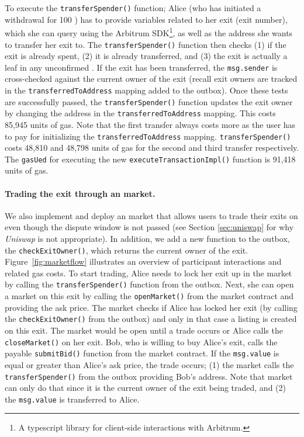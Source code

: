 To execute the \texttt{transferSpender()} function; Alice (who has initiated a withdrawal for 100 \ethtwo) has to provide variables related to her exit (\eg exit number), which she can query using the Arbitrum SDK\footnote{A typescript library for client-side interactions with Arbitrum.}, as well as the \layerone address she wants to transfer her exit to. The \texttt{transferSpender()} function then checks (1) if the exit is already spent, (2) it is already transferred, and (3) the exit is actually a leaf in any unconfirmed \rblock. If the exit has been transferred, the \texttt{msg.sender} is cross-checked against the current owner of the exit (recall exit owners are tracked in the \texttt{transferredToAddress} mapping added to the outbox). Once these tests are successfully passed, the \texttt{transferSpender()} function updates the exit owner by changing the address in the \texttt{transferredToAddress} mapping. This costs  85,945 units of \layerone gas. Note that the first transfer always costs more as the user has to pay for initializing the \texttt{transferredToAddress} mapping. \texttt{transferSpender()} costs 48,810 and 48,798 units of \layerone gas for the second and third transfer respectively. The \texttt{gasUed} for executing the new \texttt{executeTransactionImpl()} function is 91,418 units of \layerone gas.


\paragraph*{Trading the exit through an \layerone market.} We also implement and deploy an \layerone market that allows users to trade their exits on \layerone even though the dispute window is not passed (see Section \ref{sec:uniswap} for why \textit{Uniswap} is not appropriate). In addition, we add a new function to the \arb \nitro outbox, the \texttt{checkExitOwner()}, which returns the current owner of the exit. Figure~\ref{fig:marketflow} illustrates an overview of participant interactions and related gas costs. To start trading, Alice needs to lock her exit up in the market by calling the \texttt{transferSpender()} function from the outbox. Next, she can open a market on this exit by calling the \texttt{openMarket()} from the market contract and providing the ask price. The market checks if Alice has locked her exit (by calling the \texttt{checkExitOwner()} from the outbox) and only in that case a listing is created on this exit. The market would be open until a trade occurs or Alice calls the \texttt{closeMarket()} on her exit. Bob, who is willing to buy Alice's exit, calls the payable \texttt{submitBid()} function from the market contract. If the \texttt{msg.value} is equal or greater than Alice's ask price, the trade occurs; (1) the market calls the \texttt{transferSpender()} from the outbox providing Bob's address. Note that market can only do that since it is the current owner of the exit being traded, and (2) the \texttt{msg.value} is transferred to Alice.

